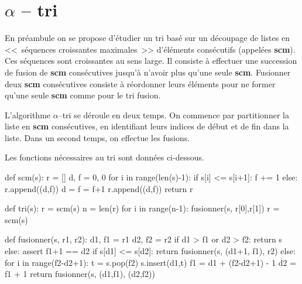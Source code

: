 \documentclass[10pt,fleqn]{article} %
\begin{document}

\vspace{2cm}
\pagestyle{fancy}
\thispagestyle{plain}

\section*{$\alpha$ -- tri}
\ifprof
\else
En préambule on se propose d'étudier un tri basé sur un découpage de listes en <<~séquences croissantes maximales~>> d'éléments consécutifs (appelées \textbf{scm}). Ces séquences sont croissantes au sens large.  Il consiste à effectuer une succession de fusion de \textbf{scm} consécutives jusqu'à n'avoir plus qu'une seule \textbf{scm}. Fusionner deux \textbf{scm} consécutives consiste à réordonner leurs éléments pour ne former qu'une seule \textbf{scm} comme pour le tri fusion. 

L'algorithme $\alpha$--tri se déroule en deux temps. On commence par partitionner la liste en \textbf{scm}
consécutives, en identifiant leurs indices de début et de fin dans la liste. Dans un second temps,
on effectue les fusions.

Les fonctions nécessaires au tri sont données ci-dessous.

\begin{py}
\begin{minipage}[c]{.45\linewidth}

\begin{python}
def scm(s):
    r = []
    d, f = 0, 0
    for i in range(len(s)-1):
        if s[i] <= s[i+1]:
            f += 1
        else:
            r.append((d,f))
            d = f = f+1
    r.append((d,f))
    return r
    
def tri(s):
    r = scm(s)
    n = len(r)
    for i in range(n-1):
        fusionner(s, r[0],r[1])
        r = scm(s)
\end{python}

\end{minipage} \hfill
\begin{minipage}[c]{.45\linewidth}

\begin{python}
def fusionner(s, r1, r2):
    d1, f1 = r1
    d2, f2 = r2
    if d1 > f1 or d2 > f2:
        return s
    else:
        assert f1+1 == d2
        if s[d1] <= s[d2]:
            return fusionner(s, (d1+1, f1), r2)
        else:
            for i in range(f2-d2+1):
                t = s.pop(f2) 
                s.insert(d1,t) 
            f1 = d1 + (f2-d2+1) - 1
            d2 = f1 + 1
            return fusionner(s, (d1,f1), (d2,f2))
\end{python}
\end{minipage}
\end{py}
\fi 
\end{document}
